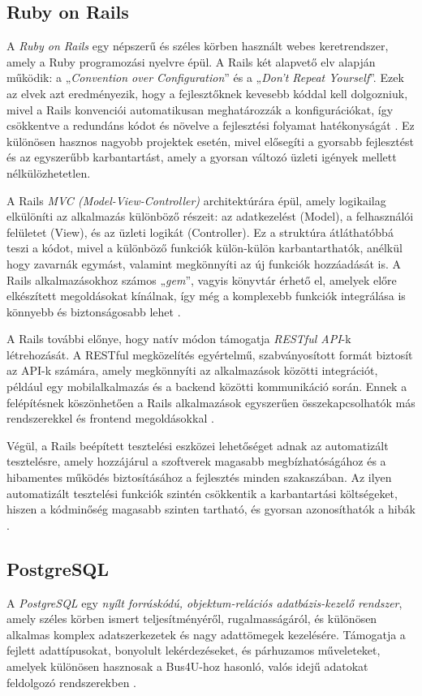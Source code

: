 \subsection{Ruby on Rails}
A \textit{Ruby on Rails} egy népszerű és széles körben használt webes keretrendszer, amely a Ruby programozási nyelvre épül. A Rails két alapvető elv alapján működik: a „\textit{Convention over Configuration}” és a „\textit{Don’t Repeat Yourself}”. Ezek az elvek azt eredményezik, hogy a fejlesztőknek kevesebb kóddal kell dolgozniuk, mivel a Rails konvenciói automatikusan meghatározzák a konfigurációkat, így csökkentve a redundáns kódot és növelve a fejlesztési folyamat hatékonyságát \cite{hartl_rails, fernandez_rails}. Ez különösen hasznos nagyobb projektek esetén, mivel elősegíti a gyorsabb fejlesztést és az egyszerűbb karbantartást, amely a gyorsan változó üzleti igények mellett nélkülözhetetlen.

A Rails \textit{MVC (Model-View-Controller)} architektúrára épül, amely logikailag elkülöníti az alkalmazás különböző részeit: az adatkezelést (Model), a felhasználói felületet (View), és az üzleti logikát (Controller). Ez a struktúra átláthatóbbá teszi a kódot, mivel a különböző funkciók külön-külön karbantarthatók, anélkül hogy zavarnák egymást, valamint megkönnyíti az új funkciók hozzáadását is. A Rails alkalmazásokhoz számos „\textit{gem}”, vagyis könyvtár érhető el, amelyek előre elkészített megoldásokat kínálnak, így még a komplexebb funkciók integrálása is könnyebb és biztonságosabb lehet \cite{hartl_rails}.

A Rails további előnye, hogy natív módon támogatja \textit{RESTful API}-k létrehozását. A RESTful megközelítés egyértelmű, szabványosított formát biztosít az API-k számára, amely megkönnyíti az alkalmazások közötti integrációt, például egy mobilalkalmazás és a backend közötti kommunikáció során. Ennek a felépítésnek köszönhetően a Rails alkalmazások egyszerűen összekapcsolhatók más rendszerekkel és frontend megoldásokkal \cite{fernandez_rails}.

Végül, a Rails beépített tesztelési eszközei lehetőséget adnak az automatizált tesztelésre, amely hozzájárul a szoftverek magasabb megbízhatóságához és a hibamentes működés biztosításához a fejlesztés minden szakaszában. Az ilyen automatizált tesztelési funkciók szintén csökkentik a karbantartási költségeket, hiszen a kódminőség magasabb szinten tartható, és gyorsan azonosíthatók a hibák \cite{hartl_rails, fernandez_rails}.

\subsection{PostgreSQL}
A \textit{PostgreSQL} egy \textit{nyílt forráskódú, objektum-relációs adatbázis-kezelő rendszer}, amely széles körben ismert teljesítményéről, rugalmasságáról, és különösen alkalmas komplex adatszerkezetek és nagy adattömegek kezelésére. Támogatja a fejlett adattípusokat, bonyolult lekérdezéseket, és párhuzamos műveleteket, amelyek különösen hasznosak a Bus4U-hoz hasonló, valós idejű adatokat feldolgozó rendszerekben \cite{douglas_postgresql, murrell_postgresql}.

